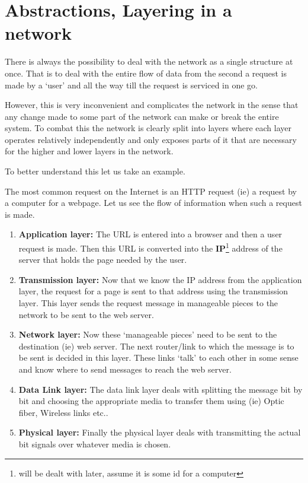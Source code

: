 \documentclass[12pt]{article}
\begin{document}
\section{Abstractions, Layering in a network}

There is always the possibility to deal with the network as a single structure at once. That is 
to deal with the entire flow of data from the second a request is made by a `user' and all the way till 
the request is serviced in one go. 

However, this is very inconvenient and complicates the network in the sense that any change made to some part of the network can make or break the entire system. 
To combat this the network is clearly split into layers where each layer operates relatively independently and only exposes parts of it that 
are necessary for the higher and lower layers in the network. 

To better understand this let us take an example.

The most common request on the Internet is an HTTP request (ie) a request by a computer for a webpage. Let us see the flow of information when such a request is made.

\begin{enumerate}
    \item \textbf{Application layer:} The URL is entered into a browser and then a user request is made. Then this URL is converted into the \textbf{IP}\footnote{will be dealt with later, assume it is some id for a computer} address of the server
    that holds the page needed by the user. 
    \item \textbf{Transmission layer:} Now that we know the IP address from the application layer, the request for a page is sent to that address using the transmission layer. This layer sends the 
    request message in manageable pieces to the network to be sent to the web server. 
    \item \textbf{Network layer:} Now these `manageable pieces' need to be sent to the destination (ie) web server. The next router/link to which the message is to be sent 
    is decided in this layer. These links `talk' to each other in some sense and know where to send messages to reach the web server. 
    \item \textbf{Data Link layer:} The data link layer deals with splitting the message bit by bit and choosing the appropriate media to transfer them using (ie) Optic fiber, Wireless links etc..
    \item \textbf{Physical layer:} Finally the physical layer deals with transmitting the actual bit signals over whatever media is chosen.
\end{enumerate}
\end{document}
